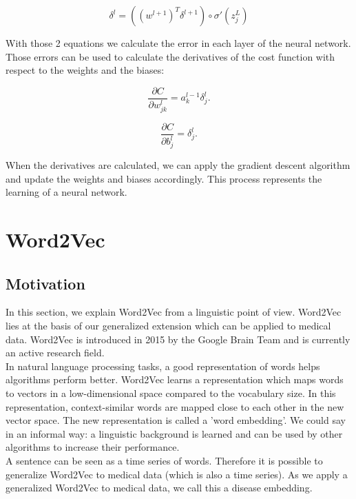 \begin{equation} 
\delta^l = ((w^{l+1})^T\delta^{l+1}) \circ \sigma'(z_j^L)
\end{equation}

\noindent With those 2 equations we calculate the error in each layer of the neural network. Those errors can be used to calculate the derivatives of the cost function with respect to the weights and the biases:

\begin{equation} 
\frac{\partial C}{\partial w^l_{jk}} = a^{l-1}_k \delta^l_j.
\end{equation}

\begin{equation} 
\frac{\partial C}{\partial b^l_j} = \delta^l_j.
\end{equation}

\noindent When the derivatives are calculated, we can apply the gradient descent algorithm and update the weights and biases accordingly. This process represents the learning of a neural network.


\section{Word2Vec}
\label{sec:word2vec}

\subsection{Motivation}

In this section, we explain Word2Vec \cite{w2vOriginal:article} from a linguistic point of view. Word2Vec lies at the basis of our generalized extension which can be applied to medical data. Word2Vec is introduced in 2015 by the Google Brain Team and is currently an active research field. \\ 

In natural language processing tasks, a good representation of words helps algorithms perform better. Word2Vec learns a representation which maps words to vectors in a low-dimensional space compared to the vocabulary size. In this representation, context-similar words are mapped close to each other in the new vector space. The new representation is called a 'word embedding'. 
We could say in an informal way: a linguistic background is learned and can be used by other algorithms to increase their performance. \\
A sentence can be seen as a time series of words. Therefore it is possible to generalize Word2Vec to medical data (which is also a time series). As we apply a generalized Word2Vec to medical data, we call this a disease embedding. \\


